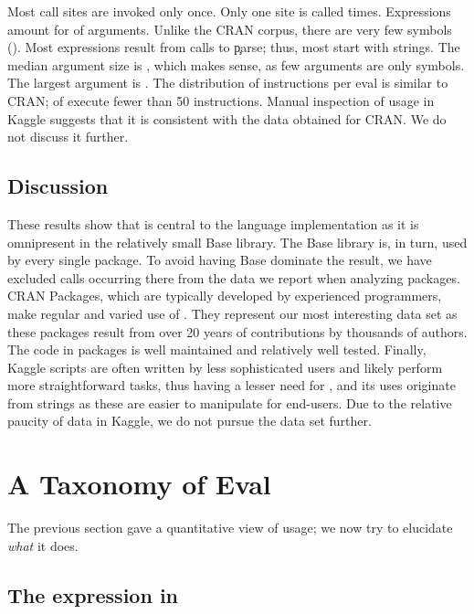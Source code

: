 \documentclass[review,screen,acmsmall,anonymous=true]{acmart}
\begin{document}
Most call sites are invoked only once. Only one site is called \kaggleMaxcalls times.
Expressions amount for \kaggleCodepercent of arguments. Unlike the CRAN corpus,
there are very few symbols (\kaggleSymbolpercent). Most expressions result from
calls to \c{parse}; thus, most \evals start with strings. The median argument
size is \kaggleMedianszeval, which makes sense, as few arguments are only
symbols. The largest argument is \kaggleMaxszeval. The distribution of
instructions per eval is similar to CRAN; \kaggleSmalleventspct of \evals
execute fewer than 50 instructions. Manual inspection of \eval usage in Kaggle
suggests that it is consistent with the data obtained for CRAN. We do not
discuss it further.


\medskip

\subsection{Discussion}
These results show that \eval is central to the language implementation as it is
omnipresent in the relatively small Base library. The Base library is, in turn,
used by every single package. To avoid having Base dominate the result, we have
excluded calls occurring there from the data we report when analyzing packages.
CRAN Packages, which are typically developed by experienced programmers, make
regular and varied use of \eval. They represent our most interesting data set as
these packages result from over 20 years of contributions by thousands of
authors. The code in packages is well maintained and relatively well tested.
Finally, Kaggle scripts are often written by less sophisticated users and
likely perform more straightforward tasks, thus having a lesser need for \eval, and its uses originate from strings as these are easier to manipulate for end-users. Due to the relative paucity of data in Kaggle, we do not pursue the data set further.

\section{A Taxonomy of Eval}

The previous section gave a quantitative view of \eval usage; we now try to
elucidate \emph{what} it does.

\subsection{The expression in \eval} \label{sec:minimized}
\end{document}
